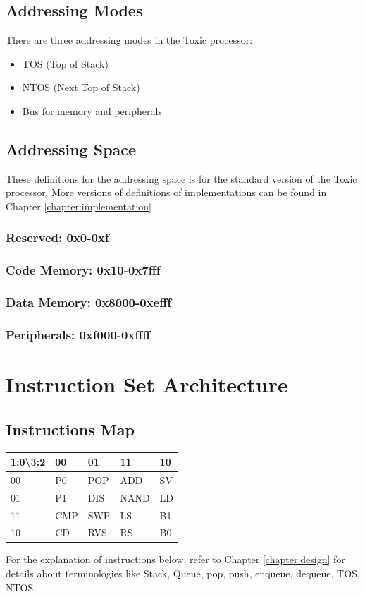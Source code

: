 \documentclass[11pt]{report}
\begin{document}
    \section{Addressing Modes}
    There are three addressing modes in the Toxic processor:
    \begin{itemize}
        \item TOS (Top of Stack)
        \item NTOS (Next Top of Stack)
        \item Bus for memory and peripherals
    \end{itemize}

    \section{Addressing Space}
    These definitions for the addressing space is for the standard version of the Toxic processor.
    More versions of definitions of implementations can be found in Chapter \ref{chapter:implementation}
    \label{section:addressingspace}
    \subsection{Reserved: 0x0-0xf}
    \subsection{Code Memory: 0x10-0x7fff}
    \subsection{Data Memory: 0x8000-0xefff}
    \subsection{Peripherals: 0xf000-0xffff}

    \chapter{Instruction Set Architecture}
    \section{Instructions Map}
    \begin{table}[h]
        \begin{tabular}{|l|l|l|l|l|}
        \hline
        1:0\textbackslash{}3:2 & 00  & 01  & 11   & 10 \\ \hline
        00                     & P0  & POP & ADD  & SV \\ \hline
        01                     & P1  & DIS & NAND & LD \\ \hline
        11                     & CMP & SWP & LS   & B1 \\ \hline
        10                     & CD  & RVS & RS   & B0 \\ \hline
        \end{tabular}
    \end{table}
    For the explanation of instructions below, refer to Chapter \ref{chapter:design} for details
    about terminologies like Stack, Queue, pop, push, enqueue, dequeue, TOS, NTOS.
\end{document}
